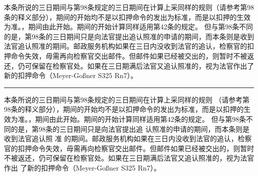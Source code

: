 \documentclass[nofonts]{ctexbook}
\begin{document}
本条所说的三日期间与第98条规定的三日期间在计算上采同样的规则（请参考第98条的释义部分），期间的开始均不是以扣押命令的发出为标准，而是以扣押的生效为准。，期间由此开始。期间的开始计算同样适用第42条的规定。
但与第98条不同的是，第98条的三日期间只是向法官提出追认照准的申请的期间，而本条则是收到法官追认照准的期间。邮政服务机构如果在三日内没收到法官的追认，检察官的扣押命令失效，毋需再向检察官交出邮件。但邮件如果已经被交出的，则暂时不被返还，仍可保留在检察官处。如果在三日期满后法官又追认照准的，视为法官作出了新的扣押命令（Meyer-Goßner S325 Rn7）。


\bigskip
\hrule
\bigskip
\obeylines



本条所说的三日期间与第98条规定的三日期间在计算上采同样的规则
（请参考第98条的释义部分），期间的开始均不是以扣押命令的发出为标准，而是以扣押的生效为准。，期间由此开始。期间的开始计算同样适用第42条的规定。
但与第98条不同的是，第98条的三日期间只是向法官提出追
认照准的申请的期间，而本条则是收到法官追认照
准
的期间。邮政服务机构如果在三日内没收到法官的追认，检察官的扣押命令失效，毋需再向检察官交出邮件。但邮件如果已经被交出的，则暂时不被返还，仍可保留在检察官处。如果在三日期满后法官又追认照准的，视为法官作出
了新的扣押命令（Meyer-Goßner S325 Rn7）。
\end{document}
